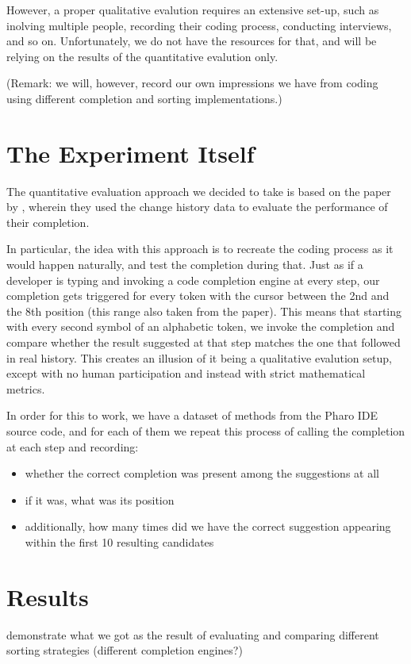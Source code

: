However, a proper qualitative evalution requires an extensive set-up, such as inolving multiple people, recording their coding process, conducting interviews, and so on. Unfortunately, we do not have the resources for that, and will be relying on the results of the quantitative evalution only.

(Remark: we will, however, record our own impressions we have from coding using different completion and sorting implementations.)

\section{The Experiment Itself}
The quantitative evaluation approach we decided to take is based on the paper by \cite{Robb08a}, wherein they used the change history data to evaluate the performance of their completion.

In particular, the idea with this approach is to recreate the coding process as it would happen naturally, and test the completion during that. Just as if a developer is typing and invoking a code completion engine at every step, our completion gets triggered for every token with the cursor between the 2nd and the 8th position (this range also taken from the \cite{Robb08a} paper). This means that starting with every second symbol of an alphabetic token, we invoke the completion and compare whether the result suggested at that step matches the one that followed in real history. This creates an illusion of it being a qualitative evalution setup, except with no human participation and instead with strict mathematical metrics.

In order for this to work, we have a dataset of methods from the Pharo IDE source code, and for each of them we repeat this process of calling the completion at each step and recording:
\begin{itemize}
    \item whether the correct completion was present among the suggestions at all
    \item if it was, what was its position
    \item additionally, how many times did we have the correct suggestion appearing within the first 10 resulting candidates
\end{itemize}

\section{Results}
demonstrate what we got as the result of evaluating and comparing different sorting strategies (different completion engines?)